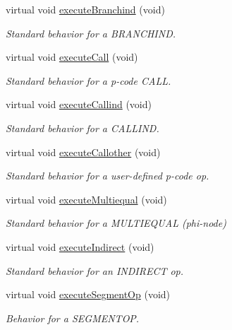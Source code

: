 \begin{DoxyCompactItemize}
virtual void \mbox{\hyperlink{class_emulate_memory_a64cee14cda2a10ed440fe171b8fdbcc0}{execute\+Branchind}} (void)
\begin{DoxyCompactList}\small\item\em Standard behavior for a B\+R\+A\+N\+C\+H\+I\+ND. \end{DoxyCompactList}\item 
virtual void \mbox{\hyperlink{class_emulate_memory_a20537bae3d7f06adeae32f99d1867b12}{execute\+Call}} (void)
\begin{DoxyCompactList}\small\item\em Standard behavior for a p-\/code C\+A\+LL. \end{DoxyCompactList}\item 
virtual void \mbox{\hyperlink{class_emulate_memory_af1c25ebc29e2e57ab762d878ac8103e4}{execute\+Callind}} (void)
\begin{DoxyCompactList}\small\item\em Standard behavior for a C\+A\+L\+L\+I\+ND. \end{DoxyCompactList}\item 
virtual void \mbox{\hyperlink{class_emulate_memory_a9a7bbbdeb9ca7f696fb8070119eb304a}{execute\+Callother}} (void)
\begin{DoxyCompactList}\small\item\em Standard behavior for a user-\/defined p-\/code op. \end{DoxyCompactList}\item 
virtual void \mbox{\hyperlink{class_emulate_memory_ae7dc193d1cdcc12ad376a1cd1505fe59}{execute\+Multiequal}} (void)
\begin{DoxyCompactList}\small\item\em Standard behavior for a M\+U\+L\+T\+I\+E\+Q\+U\+AL (phi-\/node) \end{DoxyCompactList}\item 
virtual void \mbox{\hyperlink{class_emulate_memory_a10021d3e2d5ea193a3dd6f372077c3ce}{execute\+Indirect}} (void)
\begin{DoxyCompactList}\small\item\em Standard behavior for an I\+N\+D\+I\+R\+E\+CT op. \end{DoxyCompactList}\item 
virtual void \mbox{\hyperlink{class_emulate_memory_adeaca111cdc5c93df51a020b74528886}{execute\+Segment\+Op}} (void)
\begin{DoxyCompactList}\small\item\em Behavior for a S\+E\+G\+M\+E\+N\+T\+OP. \end{DoxyCompactList}\item 

\end{DoxyCompactItemize}
